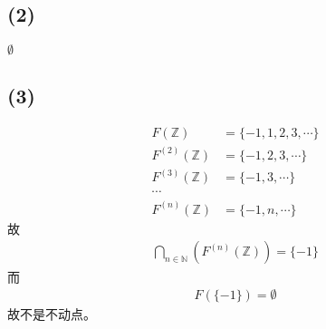 \documentclass[12pt]{article}
\begin{document}
    \subsection*{(2)}

      $\emptyset$

    \subsection*{(3)}

      \begin{align}
        F(\mathbb{Z}) &= \{-1,1,2,3,\cdots\} \\
        F^{(2)}(\mathbb{Z}) &= \{-1,2,3,\cdots\} \\
        F^{(3)}(\mathbb{Z}) &= \{-1,3,\cdots\} \\
        \cdots \\
        F^{(n)}(\mathbb{Z}) &= \{-1,n,\cdots\}
      \end{align}
      故
      \begin{gather}
        \bigcap_{n\in\mathbb{N}}\left(F^{(n)}(\mathbb{Z})\right) = \{-1\}
      \end{gather}
      而
      \begin{gather}
        F(\{-1\}) = \emptyset
      \end{gather}
      故不是不动点。
\end{document}
